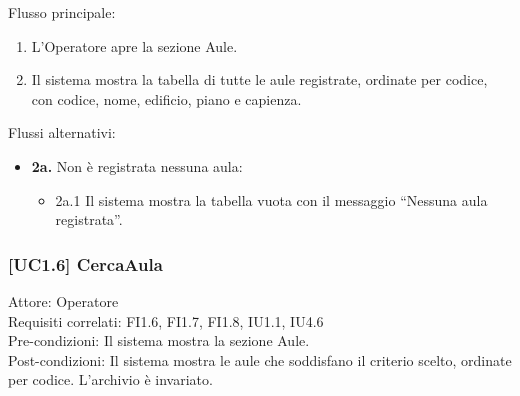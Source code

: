 \noindent Flusso principale:
\begin{enumerate}
\item L'Operatore apre la sezione Aule.
\item Il sistema mostra la tabella di tutte le aule registrate, ordinate per codice, con codice, nome, edificio, piano e capienza.
\end{enumerate}
\noindent Flussi alternativi:
\begin{itemize}
\item \textbf{2a.} Non è registrata nessuna aula:
\begin{itemize}
\item 2a.1 Il sistema mostra la tabella vuota con il messaggio ``Nessuna aula registrata''.
\end{itemize}
\end{itemize}

\subsubsection{[UC1.6] CercaAula}
\noindent Attore: Operatore\\
Requisiti correlati: FI1.6, FI1.7, FI1.8, IU1.1, IU4.6\\
Pre-condizioni: Il sistema mostra la sezione Aule.\\
Post-condizioni: Il sistema mostra le aule che soddisfano il criterio scelto, ordinate per codice. L'archivio è invariato.\\

